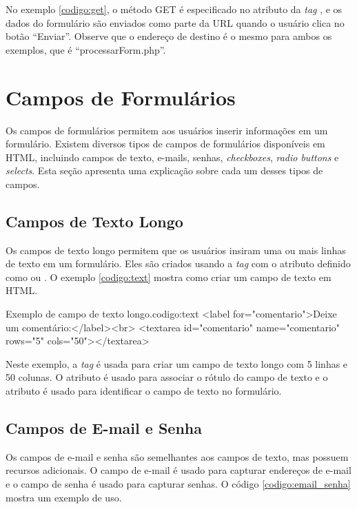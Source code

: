 No exemplo \ref{codigo:get}, o método GET é especificado no atributo  da \textit{tag} , e os dados do formulário são enviados como parte da URL quando o usuário clica no botão ``Enviar''. Observe que o endereço de destino é o mesmo para ambos os exemplos, que é ``processarForm.php''.

\section{Campos de Formulários}

Os campos de formulários permitem aos usuários inserir informações em um formulário. Existem diversos tipos de campos de formulários disponíveis em HTML, incluindo campos de texto, e-mails, senhas, \textit{checkboxes}, \textit{radio buttons} e \textit{selects}. Esta seção apresenta uma explicação sobre cada um desses tipos de campos.

\subsection{Campos de Texto Longo}

Os campos de texto longo permitem que os usuários insiram uma ou mais linhas de texto em um formulário. Eles são criados usando a \textit{tag}  com o atributo  definido como  ou . O exemplo \ref{codigo:text} mostra como criar um campo de texto em HTML.

\begin{htmlcode}{Exemplo de campo de texto longo.}{codigo:text}
<label for="comentario">Deixe um comentário:</label><br>
<textarea id="comentario" name="comentario" rows="5" cols="50"></textarea>
\end{htmlcode}

Neste exemplo, a \textit{tag}  é usada para criar um campo de texto longo com 5 linhas e 50 colunas. O atributo  é usado para associar o rótulo do campo de texto e o atributo  é usado para identificar o campo de texto no formulário.

\subsection{Campos de E-mail e Senha}

Os campos de e-mail e senha são semelhantes aos campos de texto, mas possuem recursos adicionais. O campo de e-mail é usado para capturar endereços de e-mail e o campo de senha é usado para capturar senhas. O código \ref{codigo:email_senha} mostra um exemplo de uso.

